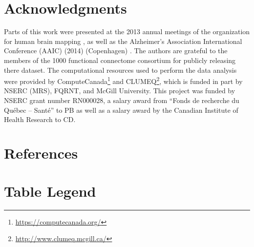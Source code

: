 \documentclass[authoryear]{elsarticle}
\begin{document}
\section{Acknowledgments}
Parts of this work were presented at the 2013 annual meetings of the organization for human brain mapping \citep{Dansereau2013}, as well as the  Alzheimer's Association International Conference (AAIC) (2014) (Copenhagen) \citep{Dansereau2014}. The authors are grateful to the members of the 1000 functional connectome consortium for publicly releasing there dataset. The computational resources used to perform the data analysis were provided by ComputeCanada\footnote{\url{https://computecanada.org/}} and CLUMEQ\footnote{\url{http://www.clumeq.mcgill.ca/}}, which is funded in part by NSERC (MRS), FQRNT, and McGill University. This project was funded by NSERC grant number RN000028, a salary award from ``Fonds de recherche du Qu\'ebec -- Sant\'e'' to PB as well as a salary award by the Canadian Institute of Health Research to CD.

\section*{References}





\pagebreak




\section{Table Legend}
\end{document}
